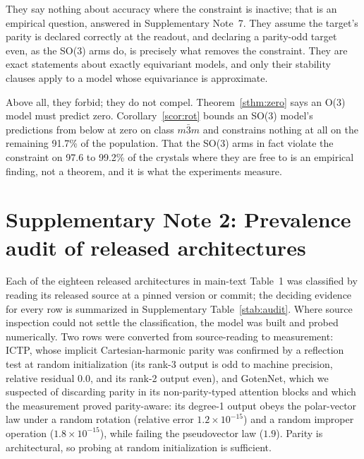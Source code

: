 They say nothing about accuracy where the constraint is inactive; that is an empirical question, answered in Supplementary Note~7. They assume the target's parity is declared correctly at the readout, and declaring a parity-odd target even, as the SO(3) arms do, is precisely what removes the constraint. They are exact statements about exactly equivariant models, and only their stability clauses apply to a model whose equivariance is approximate.

Above all, they forbid; they do not compel. Theorem~\ref{sthm:zero} says an O(3) model must predict zero. Corollary~\ref{scor:rot} bounds an SO(3) model's predictions from below at zero on class $m\bar 3 m$ and constrains nothing at all on the remaining 91.7\% of the population. That the SO(3) arms in fact violate the constraint on 97.6 to 99.2\% of the crystals where they are free to is an empirical finding, not a theorem, and it is what the experiments measure.

\section*{Supplementary Note 2: Prevalence audit of released architectures}

Each of the eighteen released architectures in main-text Table~1 was classified by reading its released source at a pinned version or commit; the deciding evidence for every row is summarized in Supplementary Table~\ref{stab:audit}. Where source inspection could not settle the classification, the model was built and probed numerically. Two rows were converted from source-reading to measurement: ICTP, whose implicit Cartesian-harmonic parity was confirmed by a reflection test at random initialization (its rank-3 output is odd to machine precision, relative residual $0.0$, and its rank-2 output even), and GotenNet, which we suspected of discarding parity in its non-parity-typed attention blocks and which the measurement proved parity-aware: its degree-1 output obeys the polar-vector law under a random rotation (relative error $1.2\times10^{-15}$) and a random improper operation ($1.8\times10^{-15}$), while failing the pseudovector law ($1.9$). Parity is architectural, so probing at random initialization is sufficient.

